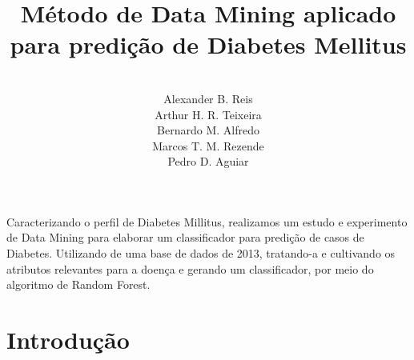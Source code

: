 \documentclass[12pt]{article}
\title{Método de Data Mining aplicado para predição de Diabetes Mellitus}
\author{\\Alexander B. Reis\inst{1}\\Arthur H. R. Teixeira\inst{2}\\Bernardo M. Alfredo\inst{3}\\Marcos T. M. Rezende\inst{4}\\Pedro D. Aguiar\inst{5}}
\begin{document}
\maketitle
     
\begin{resumo}

  Caracterizando o perfil de Diabetes Millitus, realizamos um estudo e experimento de Data Mining para elaborar um classificador para predição de casos de Diabetes. Utilizando de uma base de dados de 2013, tratando-a e cultivando os atributos relevantes para a doença e gerando um classificador, por meio do algoritmo de Random Forest.
  
\end{resumo}

\section{Introdução}
\end{document}
